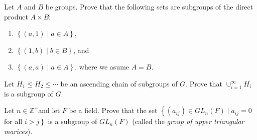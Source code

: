 \begin{questions}
\question
Let \(A\) and \(B\) be groups. Prove that the following sets are subgroups of the direct product \(A \times B\):
\begin{enumerate}[label=(\alph*)]
    \item \(\left\{ (a,1) \mid a\in A \right\}\),
    \item \(\left\{ (1,b) \mid b\in B \right\}\), and
    \item \(\left\{ (a,a) \mid a\in A \right\}\), where we asume \(A= B\).
\end{enumerate}




\question
Let \(H_1 \leq H_2 \leq \cdots\) be an ascending chain of subgroups of \(G\). Prove that \(\cup_{i=1}^{\infty} H_i\) is a subgroup of \(G\).

\question
Let \(n \in \mathbb{Z}^{+}\)and let \(F\) be a field. Prove that the set \(\left\{\left(a_{i j}\right) \in G L_n(F) \mid a_{i j}=0\right.\) for all \(\left.i>j\right\}\) is a subgroup of \(G L_n(F)\) (called the \textit{group of upper triangular marices}).

















































\end{questions}